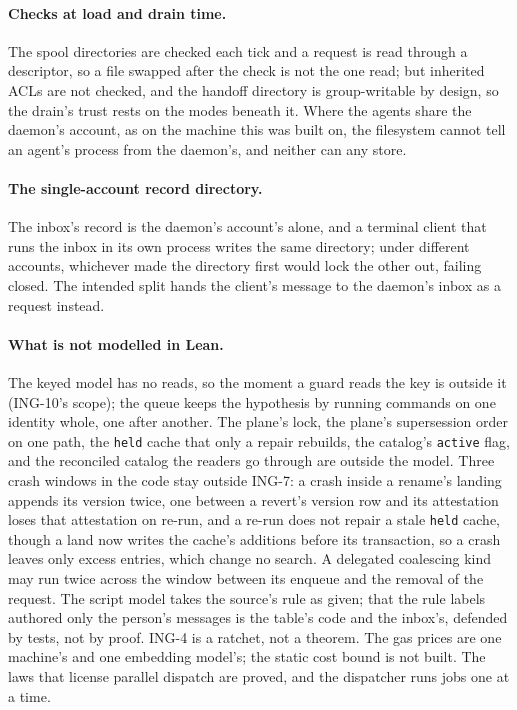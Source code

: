\documentclass[11pt]{article}
\theoremstyle{plain}
\theoremstyle{definition}
\theoremstyle{remark}
\newcommand{\code}[1]{\texttt{#1}}
\newcommand{\ing}[1]{ING-#1}
\begin{document}
\paragraph{Checks at load and drain time.}
The spool directories are checked each tick and a request is read through a descriptor, so a
file swapped after the check is not the one read; but inherited ACLs are not checked, and the
handoff directory is group-writable by design, so the drain's trust rests on the modes beneath
it. Where the agents share the daemon's account, as on the machine this was built on, the
filesystem cannot tell an agent's process from the daemon's, and neither can any store.

\paragraph{The single-account record directory.}
The inbox's record is the daemon's account's alone, and a terminal client that runs the inbox in
its own process writes the same directory; under different accounts, whichever made the
directory first would lock the other out, failing closed. The intended split hands the client's
message to the daemon's inbox as a request instead.

\paragraph{What is not modelled in Lean.}
The keyed model has no reads, so the moment a guard reads the key is outside it (\ing{10}'s
scope); the queue keeps the hypothesis by running commands on one identity whole, one after
another. The plane's lock, the plane's supersession order on one path, the \code{held} cache
that only a repair rebuilds, the catalog's \code{active} flag, and the reconciled catalog the
readers go through are outside the model. Three crash windows in the code stay outside
\ing{7}: a crash inside a rename's landing appends its version twice, one between a revert's
version row and its attestation loses that attestation on re-run, and a re-run does not repair
a stale \code{held} cache, though a land now writes the cache's additions before its
transaction, so a crash leaves only excess entries, which change no search. A delegated
coalescing kind may run twice across the window between
its enqueue and the removal of the request. The script model takes the source's rule as given;
that the rule labels authored only the person's messages is the table's code and the inbox's,
defended by tests, not by proof. \ing{4} is a ratchet, not a theorem. The gas prices are one
machine's and one embedding model's; the static cost bound is not built. The laws that license
parallel dispatch are proved, and the dispatcher runs jobs one at a time.
\end{document}
